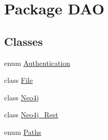 \hypertarget{namespaceDAO}{}\section{Package D\+AO}
\label{namespaceDAO}
\subsection*{Classes}
\begin{DoxyCompactItemize}
\item 
enum \hyperlink{enumDAO_1_1Authentication}{Authentication}
\item 
class \hyperlink{classDAO_1_1File}{File}
\item 
class \hyperlink{classDAO_1_1Neo4j}{Neo4j}
\item 
class \hyperlink{classDAO_1_1Neo4j__Rest}{Neo4j\+\_\+\+Rest}
\item 
enum \hyperlink{enumDAO_1_1Paths}{Paths}
\end{DoxyCompactItemize}
